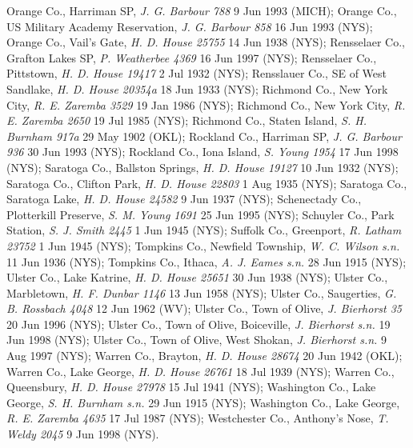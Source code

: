 \documentclass{article}
\begin{document}
Orange Co., Harriman SP, \textit{J. G. Barbour 788} 9 Jun 1993 (MICH);
Orange Co., US Military Academy Reservation, \textit{J. G. Barbour 858} 16 Jun 1993 (NYS);
Orange Co., Vail's Gate, \textit{H. D. House 25755} 14 Jun 1938 (NYS);
Rensselaer Co., Grafton Lakes SP, \textit{P. Weatherbee 4369} 16 Jun 1997 (NYS);
Rensselaer Co., Pittstown, \textit{H. D. House 19417} 2 Jul 1932 (NYS);
Rensslauer Co., SE of West Sandlake, \textit{H. D. House 20354a} 18 Jun 1933 (NYS);
Richmond Co., New York City, \textit{R. E. Zaremba 3529} 19 Jan 1986 (NYS);
Richmond Co., New York City, \textit{R. E. Zaremba 2650} 19 Jul 1985 (NYS);
Richmond Co., Staten Island, \textit{S. H. Burnham 917a} 29 May 1902 (OKL);
Rockland Co., Harriman SP, \textit{J. G. Barbour 936} 30 Jun 1993 (NYS);
Rockland Co., Iona Island, \textit{S. Young 1954} 17 Jun 1998 (NYS);
Saratoga Co., Ballston Springs, \textit{H. D. House 19127} 10 Jun 1932 (NYS);
Saratoga Co., Clifton Park, \textit{H. D. House 22803} 1 Aug 1935 (NYS);
Saratoga Co., Saratoga Lake, \textit{H. D. House 24582} 9 Jun 1937 (NYS);
Schenectady Co., Plotterkill Preserve, \textit{S. M. Young 1691} 25 Jun 1995 (NYS);
Schuyler Co., Park Station, \textit{S. J. Smith 2445} 1 Jun 1945 (NYS);
Suffolk Co., Greenport, \textit{R. Latham 23752} 1 Jun 1945 (NYS);
Tompkins Co., Newfield Township, \textit{W. C. Wilson s.n.} 11 Jun 1936 (NYS);
Tompkins Co., Ithaca, \textit{A. J. Eames s.n.} 28 Jun 1915 (NYS);
Ulster Co., Lake Katrine, \textit{H. D. House 25651} 30 Jun 1938 (NYS);
Ulster Co., Marbletown, \textit{H. F. Dunbar 1146} 13 Jun 1958 (NYS);
Ulster Co., Saugerties, \textit{G. B. Rossbach 4048} 12 Jun 1962 (WV);
Ulster Co., Town of Olive, \textit{J. Bierhorst 35} 20 Jun 1996 (NYS);
Ulster Co., Town of Olive, Boiceville, \textit{J. Bierhorst s.n.} 19 Jun 1998 (NYS);
Ulster Co., Town of Olive, West Shokan, \textit{J. Bierhorst s.n.} 9 Aug 1997 (NYS);
Warren Co., Brayton, \textit{H. D. House 28674} 20 Jun 1942 (OKL);
Warren Co., Lake George, \textit{H. D. House 26761} 18 Jul 1939 (NYS);
Warren Co., Queensbury, \textit{H. D. House 27978} 15 Jul 1941 (NYS);
Washington Co., Lake George, \textit{S. H. Burnham s.n.} 29 Jun 1915 (NYS);
Washington Co., Lake George, \textit{R. E. Zaremba 4635} 17 Jul 1987 (NYS);
Westchester Co., Anthony's Nose, \textit{T. Weldy 2045} 9 Jun 1998 (NYS).
\end{document}

